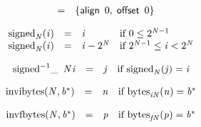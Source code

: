 \vspace{1ex}

$$
\begin{array}{@{}lcl@{}l@{}}
 &=& \{ \begin{array}[t]{@{}l@{}}
\mathsf{align}~\,0,\; \mathsf{offset}~\,0 \}\end{array} &  \\
\end{array}
$$

\vspace{1ex}

$$
\begin{array}{@{}lcl@{}l@{}}
{{\mathrm{signed}}}_{{\mathit{N}}}({\mathit{i}}) &=& {\mathit{i}} &\quad
  \mbox{if}~0 \leq {2^{{\mathit{N}} - 1}} \\
{{\mathrm{signed}}}_{{\mathit{N}}}({\mathit{i}}) &=& {\mathit{i}} - {2^{{\mathit{N}}}} &\quad
  \mbox{if}~{2^{{\mathit{N}} - 1}} \leq {\mathit{i}} < {2^{{\mathit{N}}}} \\
\end{array}
$$

$$
\begin{array}{@{}lcl@{}l@{}}
{{{{\mathrm{signed}}^{{-1}}}}{\mathsf{\_}}~\,{\mathit{N}}}{{{\mathit{i}}}} &=& {\mathit{j}} &\quad
  \mbox{if}~{{\mathrm{signed}}}_{{\mathit{N}}}({\mathit{j}}) = {{\mathit{i}}} \\
\end{array}
$$

\vspace{1ex}

$$
\begin{array}{@{}lcl@{}l@{}}
{\mathrm{invibytes}}({\mathit{N}}, {{\mathit{b}}^\ast}) &=& {\mathit{n}} &\quad
  \mbox{if}~{{\mathrm{bytes}}}_{{{\mathit{i}}}{{\mathit{N}}}}({\mathit{n}}) = {{\mathit{b}}^\ast} \\
\end{array}
$$

$$
\begin{array}{@{}lcl@{}l@{}}
{\mathrm{invfbytes}}({\mathit{N}}, {{\mathit{b}}^\ast}) &=& {\mathit{p}} &\quad
  \mbox{if}~{{\mathrm{bytes}}}_{{{\mathit{f}}}{{\mathit{N}}}}({\mathit{p}}) = {{\mathit{b}}^\ast} \\
\end{array}
$$

\vspace{1ex}

